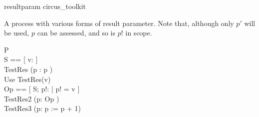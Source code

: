 
\begin{zsection}
   \SECTION resultparam \parents circus\_toolkit
\end{zsection}

A process with various forms of result parameter. Note that, although
only $p'$ will be used, $p$ can be assessed, and so is $p!$ in scope.
%
\begin{circus}
   \circprocess P \circdef \circbegin \\
   	\circstate S == [ v: \nat ] \\
	TestRes \circdef (\circres p : \nat \circspot p \prefixcolon [ true, p' = 10 ]) \\
	Use \circdef TestRes(v) \\
	Op == [ \Delta S; p!: \nat | p! = v ] \\
	TestRes2 \circdef (\circres p: \nat \circspot \lschexpract Op \rschexpract) \\
	TestRes3 \circdef (\circres p: \nat \circspot p := p + 1) \\
	\circspot \Skip \\
   \circend	
\end{circus}